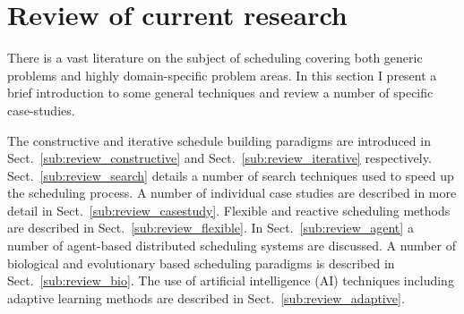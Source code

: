 \section{Review of current research}
\label{sect:review}










There is a vast literature on the subject of scheduling covering both generic problems and highly domain-specific problem areas. In this section I present a brief introduction to some general techniques and review a number of specific case-studies. 

The constructive and iterative schedule building paradigms are introduced in Sect.~\ref{sub:review_constructive} and Sect.~\ref{sub:review_iterative} respectively. Sect.~\ref{sub:review_search} details a number of search techniques used to speed up the scheduling process. A number of individual case studies are described in more detail in Sect.~\ref{sub:review_casestudy}. Flexible and reactive scheduling methods are described in Sect.~\ref{sub:review_flexible}. In Sect.~\ref{sub:review_agent} a number of agent-based distributed scheduling systems are discussed.  A number of biological and evolutionary based scheduling paradigms is described in Sect.~\ref{sub:review_bio}. The use of artificial intelligence (AI) techniques including adaptive learning methods are described in Sect.~\ref{sub:review_adaptive}. 


